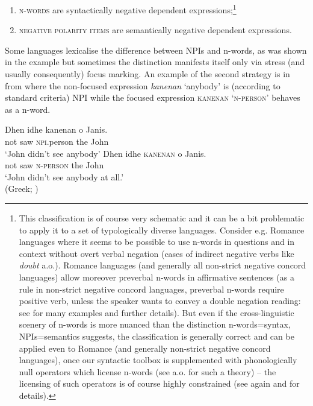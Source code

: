 \documentclass[output=paper,
]{langscibook}
\begin{document}
\largerpage
\begin{enumerate}
\def\labelenumi{\arabic{enumi})}
\item
  \textsc{n-words} are syntactically negative dependent expressions;\footnote{This classification is of course very schematic and it can be a bit problematic to apply it to a set of typologically diverse languages. Consider e.g. Romance languages where it seems to be possible to use n-words in questions and in context without overt verbal negation (cases of indirect negative verbs like \textit{doubt} a.o.). Romance languages (and generally all non-strict negative concord languages) allow moreover preverbal n-words in affirmative sentences (as a rule in non-strict negative concord languages, preverbal n-words require positive verb, unless the speaker wants to convey a double negation reading: see \cite{laka1990negation} for many examples and further details). But even if the cross-linguistic scenery of n-words is more nuanced than the distinction n-words=syntax, NPIs=semantics suggests, the classification is generally correct and can be applied even to Romance (and generally non-strict negative concord languages), once our syntactic toolbox is supplemented with phonologically null operators which license n-words (see \citealt{zeijlstra2004sentential} a.o. for such a theory) -- the licensing of such operators is of course highly constrained (see again \citealt{zeijlstra2004sentential} and \citealt{zeijlstra2008negative} for details).}
\item \textsc{negative polarity items} are semantically negative dependent expressions.
\end{enumerate}

\noindent Some languages lexicalise the difference between NPIs and n-words, as was shown in the example  but sometimes the distinction manifests itself only via stress (and usually consequently) focus marking. An example of the second strategy is in  from \cite{giannakidou2017landscape} where the non-focused expression \textit{kanenan} `anybody' is (according to standard criteria) NPI while the focused expression \textsc{kanenan} `\textsc{n-person}' behaves as a n-word.\largerpage

\ea \label{ex-2}
\ea \gll Dhen idhe kanenan o Janis.\\
not saw \textsc{npi}.person the John\\
\glt `John didn't see anybody'
\ex \gll Dhen idhe \textsc{kanenan} o Janis.\\
not saw \textsc{n-person} the John\\
\glt `John didn't see anybody at all.'\\\xspace\hfill (Greek; \citealt[17]{giannakidou2017landscape})
\z
\z
\end{document}
